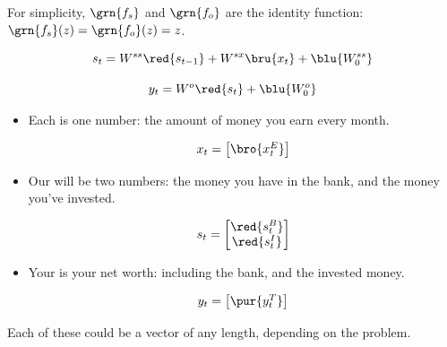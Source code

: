         For simplicity, $\grn{f_s}$ and $\grn{f_o}$ are the identity function: $\grn{f_s}(z)=\grn{f_o}(z)=z$.

        \begin{equation}
            s_t = W^{ss}\red{s_{t-1}} + W^{sx}\bru{x_t} + \blu{W^{ss}_0}
        \end{equation}

        \begin{equation}
            y_t = W^o\red{s_t} + \blu{W^o_0} 
        \end{equation}

        \subsecdiv

        \begin{itemize}
            \item Each  is one number: the amount of money you earn every month.

            \begin{equation}
                x_t = \begin{bmatrix}
                    \bro{x^{E}_t}
                \end{bmatrix}
            \end{equation}
            \item Our  will be two numbers: the money you have in the bank, and the money you've invested.

            \begin{equation}
                s_t = \begin{bmatrix}
                    \red{s^{B}_t} \\ \red{s^{I}_t}
                \end{bmatrix}
            \end{equation}

            \item Your  is your net worth: including the bank, and the invested money.

            \begin{equation}
                y_t = \begin{bmatrix}
                    \pur{y^{T}_t}
                \end{bmatrix}
            \end{equation}
        \end{itemize}

        Each of these could be a vector of any length, depending on the problem.

